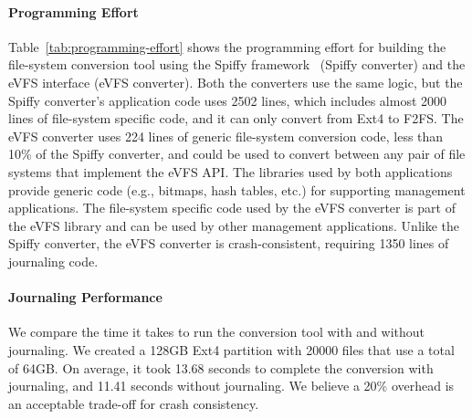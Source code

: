 \vspace{-0.25em}
\paragraph{Programming Effort} Table~\ref{tab:programming-effort} shows the programming effort for building the file-system conversion tool using the Spiffy framework~\cite{sun2018spiffy} (Spiffy converter) and the eVFS interface (eVFS converter). Both the converters use the same logic, but the Spiffy converter's application code uses 2502 lines, which includes almost 2000 lines of file-system specific code, and it can only convert from Ext4 to F2FS. The eVFS converter uses 224 lines of generic file-system conversion code, less than 10\% of the Spiffy converter, and could be used to convert between any pair of file systems that implement the eVFS API. The libraries used by both applications provide generic code (e.g., bitmaps, hash tables, etc.) for supporting management applications. The file-system specific code used by the eVFS converter is part of the eVFS library and can be used by other management applications. Unlike the Spiffy converter, the eVFS converter is crash-consistent, requiring 1350 lines of journaling code.
  
\vspace{-0.25em}
\paragraph{Journaling Performance} We compare the time it takes to run the conversion tool with and without journaling. We created a 128GB Ext4 partition with 20000 files that use a total of 64GB. On average, it took 13.68 seconds to complete the conversion with journaling, and 11.41 seconds without journaling. We believe a 20\% overhead is an acceptable trade-off for crash consistency.


